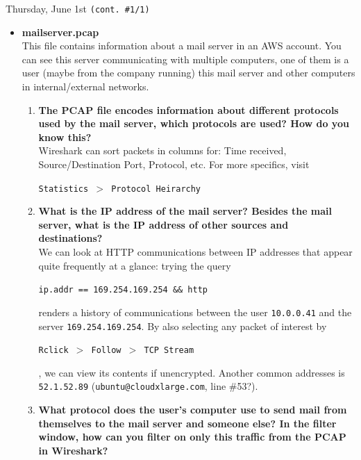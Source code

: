 \documentclass[11pt]{article}
\newcommand\codebox[1]{
    \noindent\hspace{-0.25em}\begin{tcolorbox}[on line, hbox, colback = codeblack, colframe = codeborder, coltext = white, boxrule = 1.5pt, left = 2pt, right = 2pt, top = 0.5pt, bottom = 0.5pt]
    \small\texttt{#1}\normalsize
    \end{tcolorbox}\hspace{-0.25em}
}
\begin{document}
\begin{bloodorangebox}{Thursday, June 1st \hspace{0.2cm}\texttt{(cont. \#1/1)}\vspace{-2.2em}\begin{flushright}\large {}\end{flushright}}
    \begin{itemize}
        \item\LARGE\textbf{mailserver.pcap} \\
        \normalsize This file contains information about a mail server in an AWS account. You can see this server communicating with multiple computers, one of them is a user (maybe from the company running) this mail server and other computers in internal/external networks.
        \begin{enumerate}
            \item \textbf{The PCAP file encodes information about different protocols used by the mail server, which protocols are used? How do you know this?} \\
        
            \vspace{-1em}
            Wireshark can sort packets in columns for: Time received, Source/Destination Port, Protocol, etc. For more specifics, visit \codebox{Statistics $>$ Protocol Heirarchy}
            \item \textbf{What is the IP address of the mail server? Besides the mail server, what is the IP address of other sources and destinations?} \\
        
            \vspace{-1em}
            We can look at HTTP communications between IP addresses that appear quite frequently at a glance: trying the query \codebox{ip.addr == 169.254.169.254 \&\& http} renders a history of communications between the user \texttt{10.0.0.41} and the server \texttt{169.254.169.254}. By also selecting any packet of interest by \codebox{Rclick $>$ Follow $>$ TCP Stream}, we can view its contents if unencrypted. Another common addresses is \texttt{52.1.52.89} (\texttt{ubuntu@cloudxlarge.com}, line \#53?).
            \item \textbf{What protocol does the user's computer use to send mail from themselves to the mail server and someone else? In the filter window, how can you filter on only this traffic from the PCAP in Wireshark?} \\
        

\end{enumerate}
\end{itemize}
\end{bloodorangebox}
\end{document}
